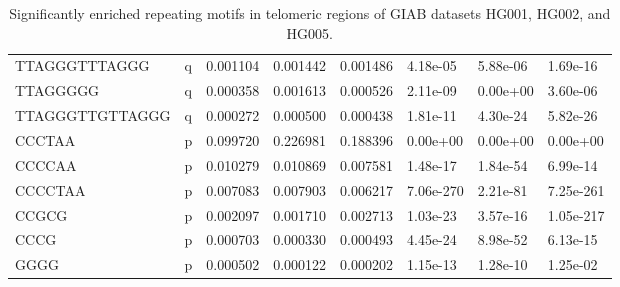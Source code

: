 \begin{samepage}
\begin{table}[h!]
\begin{tabular}{llllllll}
TTAGGGTTTAGGG   & q            & 0.001104       &  0.001442      &  0.001486      &  4.18e-05      &  5.88e-06      &  1.69e-16      \\
TTAGGGGG        & q            & 0.000358       &  0.001613      &  0.000526      &  2.11e-09      &  0.00e+00      &  3.60e-06      \\
TTAGGGTTGTTAGGG & q            & 0.000272       &  0.000500      &  0.000438      &  1.81e-11      &  4.30e-24      &  5.82e-26      \\
CCCTAA          & p            & 0.099720       &  0.226981      &  0.188396      &  0.00e+00      &  0.00e+00      &  0.00e+00      \\
CCCCAA          & p            & 0.010279       &  0.010869      &  0.007581      &  1.48e-17      &  1.84e-54      &  6.99e-14      \\
CCCCTAA         & p            & 0.007083       &  0.007903      &  0.006217      &  7.06e-270     &  2.21e-81      &  7.25e-261     \\
CCGCG           & p            & 0.002097       &  0.001710      &  0.002713      &  1.03e-23      &  3.57e-16      &  1.05e-217     \\
CCCG            & p            & 0.000703       &  0.000330      &  0.000493      &  4.45e-24      &  8.98e-52      &  6.13e-15      \\
GGGG            & p            & 0.000502       &  0.000122      &  0.000202      &  1.15e-13      &  1.28e-10      &  1.25e-02      \\
\hline
\end{tabular}
\caption{Significantly enriched repeating motifs in telomeric regions of GIAB datasets HG001, HG002, and HG005.}
\label{tab:repeatfinder_full}
\end{table}
\end{samepage}
